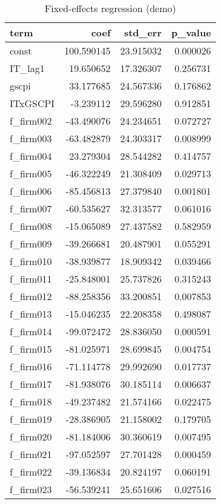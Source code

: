 \begin{table}
\centering
\caption{Fixed-effects regression (demo)}
\label{tab:fe_main}
\begin{tabular}{lrrr}
\toprule
     term &       coef &   std\_err &  p\_value \\
\midrule
    const & 100.590145 & 23.915032 & 0.000026 \\
  IT\_lag1 &  19.650652 & 17.326307 & 0.256731 \\
    gscpi &  33.177685 & 24.567336 & 0.176862 \\
 ITxGSCPI &  -3.239112 & 29.596280 & 0.912851 \\
f\_firm002 & -43.490076 & 24.234651 & 0.072727 \\
f\_firm003 & -63.482879 & 24.303317 & 0.008999 \\
f\_firm004 &  23.279304 & 28.544282 & 0.414757 \\
f\_firm005 & -46.322249 & 21.308409 & 0.029713 \\
f\_firm006 & -85.456813 & 27.379840 & 0.001801 \\
f\_firm007 & -60.535627 & 32.313577 & 0.061016 \\
f\_firm008 & -15.065089 & 27.437582 & 0.582959 \\
f\_firm009 & -39.266681 & 20.487901 & 0.055291 \\
f\_firm010 & -38.939877 & 18.909342 & 0.039466 \\
f\_firm011 & -25.848001 & 25.737826 & 0.315243 \\
f\_firm012 & -88.258356 & 33.200851 & 0.007853 \\
f\_firm013 & -15.046235 & 22.208358 & 0.498087 \\
f\_firm014 & -99.072472 & 28.836050 & 0.000591 \\
f\_firm015 & -81.025971 & 28.699845 & 0.004754 \\
f\_firm016 & -71.114778 & 29.992690 & 0.017737 \\
f\_firm017 & -81.938076 & 30.185114 & 0.006637 \\
f\_firm018 & -49.237482 & 21.574166 & 0.022475 \\
f\_firm019 & -28.386905 & 21.158002 & 0.179705 \\
f\_firm020 & -81.184006 & 30.360619 & 0.007495 \\
f\_firm021 & -97.052597 & 27.701428 & 0.000459 \\
f\_firm022 & -39.136834 & 20.824197 & 0.060191 \\
f\_firm023 & -56.539241 & 25.651606 & 0.027516 \\

\end{tabular}
\end{table}
